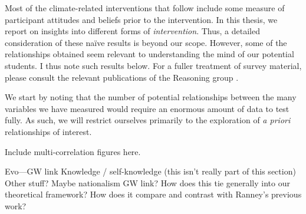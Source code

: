 Most of the climate-related interventions that follow include some measure of
participant attitudes and beliefs prior to the intervention. In this thesis, we
report on insights into different forms of \emph{intervention}. Thus, a detailed
consideration of these na\"ive
results is beyond our scope. However, some of the relationships obtained seem
relevant to understanding the mind of our potential students. I thus note such
results below. For a fuller treatment of survey material, please consult the
relevant publications of the Reasoning group
\cite[notably,][]{cohen-thesis,ranney-etal-2012}.

We start by noting that the number of potential relationships between the many
variables we have measured would require an enormous amount of data to test
fully. As such, we will restrict ourselves primarily to the exploration of
\emph{a priori} relationships of interest.

Include multi-correlation figures here.

Evo—GW link
Knowledge / self-knowledge (this isn’t really part of this section)
Other stuff? Maybe nationalism GW link? How does this tie generally into our
theoretical framework? How does it compare and contrast with Ranney’s previous
work?

